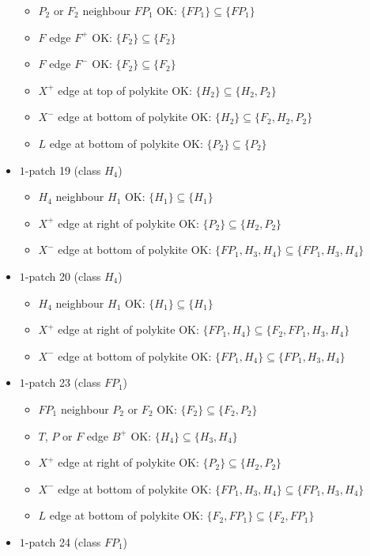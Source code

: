 \begin{itemize}
\begin{itemize}
\item $P_2$ or $F_2$ neighbour $FP_1$ OK: $\{FP_1\} \subseteq \{FP_1\}$
\item $F$ edge $F^+$ OK: $\{F_2\} \subseteq \{F_2\}$
\item $F$ edge $F^-$ OK: $\{F_2\} \subseteq \{F_2\}$
\item $X^+$ edge at top of polykite OK: $\{H_2\} \subseteq \{H_2, P_2\}$
\item $X^-$ edge at bottom of polykite OK: $\{H_2\} \subseteq \{F_2, H_2, P_2\}$
\item $L$ edge at bottom of polykite OK: $\{P_2\} \subseteq \{P_2\}$
\end{itemize}
\item $1$-patch 19 (class $H_4$)
\begin{itemize}
\item $H_4$ neighbour $H_1$ OK: $\{H_1\} \subseteq \{H_1\}$
\item $X^+$ edge at right of polykite OK: $\{P_2\} \subseteq \{H_2, P_2\}$
\item $X^-$ edge at bottom of polykite OK: $\{FP_1, H_3, H_4\} \subseteq \{FP_1, H_3, H_4\}$
\end{itemize}
\item $1$-patch 20 (class $H_4$)
\begin{itemize}
\item $H_4$ neighbour $H_1$ OK: $\{H_1\} \subseteq \{H_1\}$
\item $X^+$ edge at right of polykite OK: $\{FP_1, H_4\} \subseteq \{F_2, FP_1, H_3, H_4\}$
\item $X^-$ edge at bottom of polykite OK: $\{FP_1, H_4\} \subseteq \{FP_1, H_3, H_4\}$
\end{itemize}
\item $1$-patch 23 (class $FP_1$)
\begin{itemize}
\item $FP_1$ neighbour $P_2$ or $F_2$ OK: $\{F_2\} \subseteq \{F_2, P_2\}$
\item $T$, $P$ or $F$ edge $B^+$ OK: $\{H_4\} \subseteq \{H_3, H_4\}$
\item $X^+$ edge at right of polykite OK: $\{P_2\} \subseteq \{H_2, P_2\}$
\item $X^-$ edge at bottom of polykite OK: $\{FP_1, H_3, H_4\} \subseteq \{FP_1, H_3, H_4\}$
\item $L$ edge at bottom of polykite OK: $\{F_2, FP_1\} \subseteq \{F_2, FP_1\}$
\end{itemize}
\item $1$-patch 24 (class $FP_1$)

\end{itemize}
